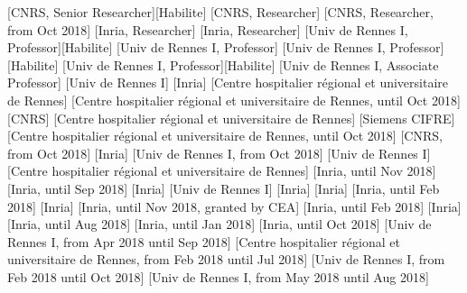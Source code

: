 \documentclass{ra2018}
\begin{document}
\begin{composition}
[CNRS, Senior Researcher][Habilite]
[CNRS, Researcher]
[CNRS, Researcher, from Oct 2018]
[Inria, Researcher]
[Inria, Researcher]
[Univ de Rennes I, Professor][Habilite]
[Univ de Rennes I, Professor]
[Univ de Rennes I, Professor][Habilite]
[Univ de Rennes I, Professor][Habilite]
[Univ de Rennes I, Associate Professor]
[Univ de Rennes I]
[Inria]
[Centre hospitalier régional et universitaire de Rennes]
[Centre hospitalier régional et universitaire de Rennes, until Oct 2018]
[CNRS]
[Centre hospitalier régional et universitaire de Rennes]
[Siemens CIFRE]
[Centre hospitalier régional et universitaire de Rennes, until Oct 2018]
[CNRS, from Oct 2018]
[Inria]
[Univ de Rennes I, from Oct 2018]
[Univ de Rennes I]
[Centre hospitalier régional et universitaire de Rennes]
[Inria, until Nov 2018]
[Inria, until Sep 2018]
[Inria]
[Univ de Rennes I]
[Inria]
[Inria]
[Inria, until Feb 2018]
[Inria]
[Inria, until Nov 2018, granted by CEA]
[Inria, until Feb 2018]
[Inria]
[Inria, until Aug 2018]
[Inria, until Jan 2018]
[Inria, until Oct 2018]
[Univ de Rennes I, from Apr 2018 until Sep 2018]
[Centre hospitalier régional et universitaire de Rennes, from Feb 2018 until Jul 2018]
[Univ de Rennes I, from Feb 2018 until Oct 2018]
[Univ de Rennes I, from May 2018 until Aug 2018]

\end{composition}
\end{document}
